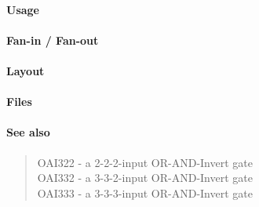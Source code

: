 \paragraph{Usage}

\paragraph{Fan-in / Fan-out}

\paragraph{Layout}

\paragraph{Files}

\paragraph{See also}
\begin{quote}
    OAI322 - a 2-2-2-input OR-AND-Invert gate \\
    OAI332 - a 3-3-2-input OR-AND-Invert gate \\
    OAI333 - a 3-3-3-input OR-AND-Invert gate
\end{quote}
